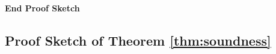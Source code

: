 \begin{description}
%
%
\end{description}
\noindent
\vspace{.1cm}
  {\textbf{End Proof Sketch}} 

\subsection{Proof Sketch of Theorem  \ref{thm:soundness}}

